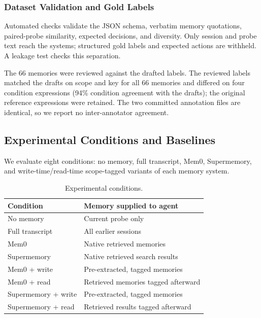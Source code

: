 \documentclass[11pt,a4paper]{article}
\begin{document}
\subsubsection{Dataset Validation and Gold Labels}

Automated checks validate the JSON schema, verbatim
memory quotations, paired-probe similarity, expected
decisions, and diversity. Only session and probe text
reach the systems; structured gold labels and expected
actions are withheld. A leakage test checks this
separation.

The 66 memories were reviewed against the drafted labels. The
reviewed labels matched the drafts on scope and
key for all 66 memories and differed on four condition
expressions (94\% condition agreement with the drafts); the original reference
expressions were retained. The two committed annotation files are
identical, so we report no inter-annotator agreement.

\subsection{Experimental Conditions and Baselines}
\label{sec:conditions}

We evaluate eight conditions: no memory, full transcript,
Mem0, Supermemory, and write-time/read-time scope-tagged
variants of each memory system.

\begin{table}[htbp]
\centering
\small
\caption{Experimental conditions.}
\label{tab:conditions}
\begin{tabularx}{\linewidth}{lX}
\toprule
Condition & Memory supplied to agent \\
\midrule
No memory & Current probe only \\
Full transcript & All earlier sessions \\
Mem0 & Native retrieved memories \\
Supermemory & Native retrieved search results \\
Mem0 + write & Pre-extracted, tagged memories \\
Mem0 + read & Retrieved memories tagged afterward \\
Supermemory + write & Pre-extracted, tagged memories \\
Supermemory + read & Retrieved results tagged afterward \\
\bottomrule
\end{tabularx}
\end{table}
\end{document}
